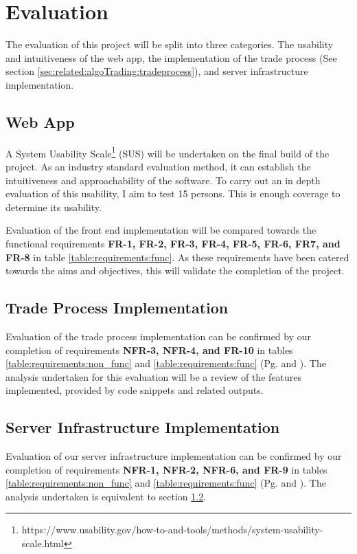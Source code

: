 %
\chapter{Evaluation}
\label{sec:evaluation}

The evaluation of this project will be split into three categories. The usability and intuitiveness of the web app, the implementation of the trade process (See section \ref{sec:related:algoTrading:tradeprocess}), and server infrastructure implementation.


\section{Web App}
\label{sec:evaluation:ui}
\noindent A System Usability Scale\footnote{https://www.usability.gov/how-to-and-tools/methods/system-usability-scale.html} (SUS) will be undertaken on the final build of the project. As an industry standard evaluation method, it can establish the intuitiveness and approachability of the software. To carry out an in depth evaluation of this usability, I aim to test 15 persons. This is enough coverage to determine its usability.

Evaluation of the front end implementation will be compared towards the functional requirements \textbf{FR-1, FR-2, FR-3, FR-4, FR-5, FR-6, FR7, and FR-8} in table \ref{table:requirements:func}. As these requirements have been catered towards the aims and objectives, this will validate the completion of the project.


\section{Trade Process Implementation}
\label{sec:evaluation:tradeprocess}
\noindent Evaluation of the trade process implementation can be confirmed by our completion of requirements \textbf{NFR-3, NFR-4, and FR-10} in tables \ref{table:requirements:non_func} and \ref{table:requirements:func} (Pg. \pageref{table:requirements:non_func} and \pageref{table:requirements:func}). The analysis undertaken for this evaluation will be a review of the features implemented, provided by code snippets and related outputs.



\section{Server Infrastructure Implementation}
\label{sec:evaluation:simulteneous}
Evaluation of our server infrastructure implementation can be confirmed by our completion of requirements \textbf{NFR-1, NFR-2, NFR-6, and FR-9} in tables \ref{table:requirements:non_func} and \ref{table:requirements:func} (Pg. \pageref{table:requirements:non_func} and \pageref{table:requirements:func}). The analysis undertaken is equivalent to section \ref{sec:evaluation:tradeprocess}.